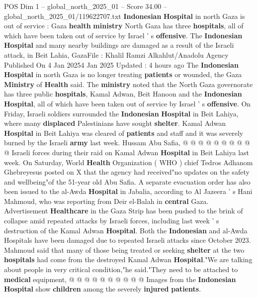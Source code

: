 \begin{textsample}{POS Dim 1 – global\_north\_2025\_01 – Score 34.00 – global\_north\_2025\_01/119622707.txt}  \label{ex:f1_pos_364}
\textbf{Indonesian} \textbf{Hospital} in north Gaza is out of service : Gaza \textbf{health} \textbf{ministry} North Gaza has three \textbf{hospitals}, all of which have been taken out of service by Israel ' s \textbf{offensive}.
The \textbf{Indonesian} \textbf{Hospital} and many nearby buildings are damaged as a result of the Israeli attack, in Beit Lahia, GazaFile : Khalil Ramzi Alkahlut/Anadolu Agency Published On 4 Jan 20254 Jan 2025 Updated : 4 hours ago The \textbf{Indonesian} \textbf{Hospital} in north Gaza is no longer treating \textbf{patients} or wounded, the Gaza \textbf{Ministry} of \textbf{Health} said.
The \textbf{ministry} noted that the North Gaza governorate has three public \textbf{hospitals}, Kamal Adwan, Beit Hanoon and the \textbf{Indonesian} \textbf{Hospital}, all of which have been taken out of service by Israel ' s \textbf{offensive}.
On Friday, Israeli soldiers surrounded the \textbf{Indonesian} \textbf{Hospital} in Beit Lahiya, where many \textbf{displaced} Palestinians have sought \textbf{shelter}.
Kamal Adwan \textbf{Hospital} in Beit Lahiya was cleared of \textbf{patients} and staff and it was severely burned by the Israeli \textbf{army} last week.
Hussam Abu Safia, @ @ @ @ @ @ @ @ @ @ Israeli forces during their raid on Kamal Adwan \textbf{Hospital} in Beit Lahiya last week.
On Saturday, World \textbf{Health} Organization ( WHO ) chief Tedros Adhanom Ghebreyesus posted on X that the agency had received"no updates on the safety and wellbeing"of the 51-year old Abu Safia.
A separate evacuation order has also been issued to the al-Awda \textbf{Hospital} in Jabalia, according to Al Jazeera ' s Hani Mahmoud, who was reporting from Deir el-Balah in \textbf{central} Gaza.
Advertisement \textbf{Healthcare} in the Gaza Strip has been pushed to the brink of collapse amid repeated attacks by Israeli forces, including last week ' s destruction of the Kamal Adwan \textbf{Hospital}.
Both the \textbf{Indonesian} and al-Awda Hospitals have been damaged due to repeated Israeli attacks since October 2023.
Mahmoud said that many of those being treated or seeking \textbf{shelter} at the two \textbf{hospitals} had come from the destroyed Kamal Adwan \textbf{Hospital}."We are talking about people in very critical condition,"he said."They need to be attached to \textbf{medical} equipment, @ @ @ @ @ @ @ @ @ @ Images from the \textbf{Indonesian} \textbf{Hospital} show \textbf{children} among the severely \textbf{injured} \textbf{patients}.

\end{textsample}
